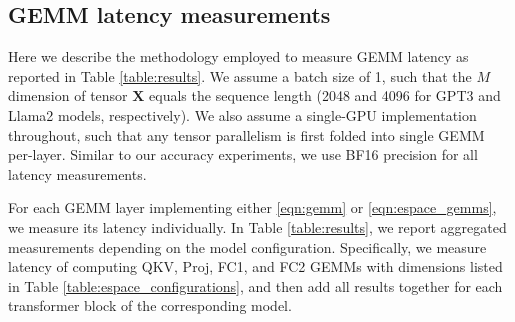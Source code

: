 \documentclass{article}
\theoremstyle{plain}
\begin{document}
\subsection{GEMM latency measurements}
\label{app:latency}
Here we describe the methodology employed to measure GEMM latency as reported in Table \ref{table:results}. We assume a batch size of 1, such that the $M$ dimension of tensor $\mathbf{X}$ equals the sequence length (2048 and 4096 for GPT3 and Llama2 models, respectively). We also assume a single-GPU implementation throughout, such that any tensor parallelism is first folded into single GEMM per-layer. Similar to our accuracy experiments, we use BF16 precision for all latency measurements.

For each GEMM layer implementing either \eqref{eqn:gemm} or \eqref{eqn:espace_gemms}, we measure its latency individually. In Table \ref{table:results}, we report aggregated measurements depending on the model configuration. Specifically, we measure latency of computing QKV, Proj, FC1, and FC2 GEMMs with dimensions listed in Table \ref{table:espace_configurations}, and then add all results together for each transformer block of the corresponding model. 
\end{document}
